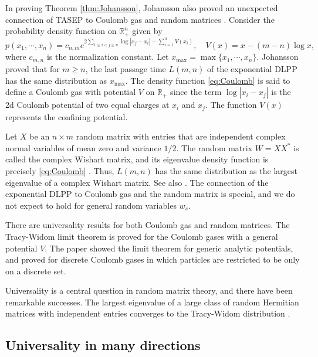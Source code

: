 \documentclass[10pt]{article}
\theoremstyle{plain}
\theoremstyle{definition}
\newcommand{\beq}{ \begin{equation} }
\newcommand{\eeq}{ \end{equation} }
\newcommand{\R}{\mathbb{R}}
\numberwithin{equation}{section}
\begin{document}
In proving Theorem \ref{thm:Johansson}, Johansson also proved an unexpected connection of TASEP to Coulomb gas and random matrices \cite{Johansson00}. 
Consider the probability density function on $\R_+^n$ given by 
\beq \label{eq:Coulomb}
	p(x_1, \cdots, x_n) = c_{n, m} e^{2\sum_{1\le i<j\le n} \log |x_j-x_i|- \sum_{i=1}^n V(x_i) }, 
	\quad V(x)= x-(m-n)\log x, 
\eeq
where $c_{m,n}$ is the normalization constant.  
Let $x_{\max}=\max\{x_1, \cdots, x_n\}$. 
Johansson proved that for $m\ge n$, the last passage time $L(m,n)$ of the exponential DLPP has the same distribution as $x_{\max}$. 
The density function \eqref{eq:Coulomb} is said to define a  Coulomb gas with potential $V$ on $\R_+$ since the term $\log |x_i-x_j|$ is the 2d Coulomb potential of two equal charges at $x_i$ and $x_j$. 
The function $V(x)$ represents the confining potential. 

Let $X$ be an $n\times m$ random matrix with entries that are independent complex normal variables of mean zero and variance $1/2$. 
The random matrix $W=XX^*$ is called the complex Wishart matrix, and its eigenvalue density function is precisely \eqref{eq:Coulomb} \cite{Forrester10}. 
Thus, $L(m,n)$ has the same distribution as the largest eigenvalue of a complex Wishart matrix. 
See also \cite{Borodin-Peche08}. 
The connection of the exponential DLPP to Coulomb gas and the random matrix is special, and we do not expect to hold for general random variables $w_s$. 

There are universality results for both Coulomb gas and random matrices. 
The Tracy-Widom limit theorem is proved for the Coulomb gases with a general potential $V$. 
The paper \cite{Deift-Kriecherbauer-McLaughlin-Venakides-Zhou99} showed the limit theorem for generic analytic potentials, and \cite{Baik-Kriecherbauer-McLaughlin-Miller07} proved for discrete Coulomb gases in which particles are restricted to be only on a discrete set. 

Universality is a central question in random matrix theory, and there have been remarkable successes. 
The largest eigenvalue of a large class of random Hermitian matrices with independent entries converges to the Tracy-Widom distribution  \cite{Soshnikov99, Tao-Vu10, Erdos-Knowles-Yau-Yin12, Lee-Yin14}. 


\subsection{Universality in many directions} \label{sec:univs}
\end{document}
